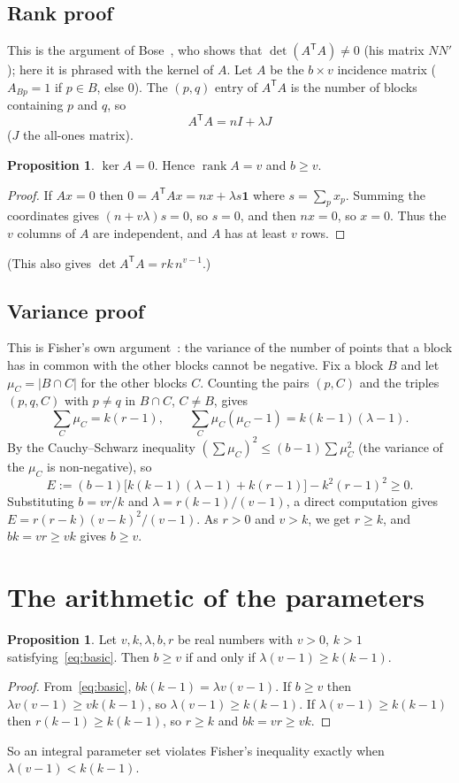 \documentclass[11pt,a4paper]{article}
\theoremstyle{definition}
\newtheorem{proposition}[theorem]{Proposition}
\DeclareMathOperator{\rank}{rank}
\begin{document}
\subsection{Rank proof}
This is the argument of Bose~\cite{bose1949}, who shows that $\det(A^{\mathsf T}A)\ne0$ (his matrix $NN'$); here it is phrased with the kernel of $A$.
Let $A$ be the $b\times v$ incidence matrix ($A_{Bp}=1$ if $p\in B$, else $0$).
The $(p,q)$ entry of $A^{\mathsf T}A$ is the number of blocks containing $p$ and $q$, so
\[ A^{\mathsf T}A=nI+\lambda J \]
($J$ the all-ones matrix).
\begin{proposition}
  $\ker A=0$. Hence $\rank A=v$ and $b\ge v$.
\end{proposition}
\begin{proof}
  If $Ax=0$ then $0=A^{\mathsf T}Ax=nx+\lambda s\mathbf 1$ where $s=\sum_px_p$.
  Summing the coordinates gives $(n+v\lambda)s=0$, so $s=0$, and then $nx=0$, so $x=0$.
  Thus the $v$ columns of $A$ are independent, and $A$ has at least $v$ rows.
\end{proof}
(This also gives $\det A^{\mathsf T}A=rk\,n^{v-1}$.)

\subsection{Variance proof}
This is Fisher's own argument~\cite[\S1]{fisher1940}: the variance of the number of points that a block has in common with the other blocks cannot be negative.
Fix a block $B$ and let $\mu_C=|B\cap C|$ for the other blocks $C$.
Counting the pairs $(p,C)$ and the triples $(p,q,C)$ with $p\ne q$ in $B\cap C$, $C\ne B$, gives
\[ \sum_C\mu_C=k(r-1),\qquad \sum_C\mu_C(\mu_C-1)=k(k-1)(\lambda-1). \]
By the Cauchy--Schwarz inequality $(\sum\mu_C)^2\le(b-1)\sum\mu_C^2$ (the variance of the $\mu_C$ is non-negative), so
\[ E:=(b-1)\bigl[k(k-1)(\lambda-1)+k(r-1)\bigr]-k^2(r-1)^2\ge0. \]
Substituting $b=vr/k$ and $\lambda=r(k-1)/(v-1)$, a direct computation gives $E=r(r-k)(v-k)^2/(v-1)$.
As $r>0$ and $v>k$, we get $r\ge k$, and $bk=vr\ge vk$ gives $b\ge v$.

\section{The arithmetic of the parameters}\label{sec:arith}
\begin{proposition}\label{prop:equiv}
  Let $v,k,\lambda,b,r$ be real numbers with $v>0$, $k>1$ satisfying~\eqref{eq:basic}. Then $b\ge v$ if and only if $\lambda(v-1)\ge k(k-1)$.
\end{proposition}
\begin{proof}
  From~\eqref{eq:basic}, $bk(k-1)=\lambda v(v-1)$.
  If $b\ge v$ then $\lambda v(v-1)\ge vk(k-1)$, so $\lambda(v-1)\ge k(k-1)$.
  If $\lambda(v-1)\ge k(k-1)$ then $r(k-1)\ge k(k-1)$, so $r\ge k$ and $bk=vr\ge vk$.
\end{proof}
So an integral parameter set violates Fisher's inequality exactly when $\lambda(v-1)<k(k-1)$.
\end{document}

